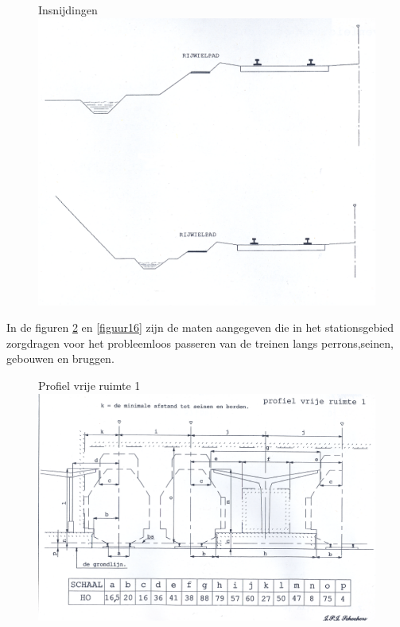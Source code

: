 \documentclass[12pt,a4paper]{report}
\begin{document}
\begin{figure}[ht]
  \captionbox
  {Insnijdingen\label{figuur13}}
  {\includegraphics[scale=1.0]{images/rcu_figuur13_14}}
\end{figure}

In de figuren \ref{figuur15} en \ref{figuur16} zijn de maten aangegeven die in het stationsgebied zorgdragen voor het probleemloos passeren van de treinen langs perrons,seinen, gebouwen en bruggen.

\begin{figure}[ht]
  \captionbox
  {Profiel vrije ruimte 1\label{figuur15}}
  {\includegraphics[scale=0.6]{images/rcu_figuur15}}
\end{figure}
\end{document}
